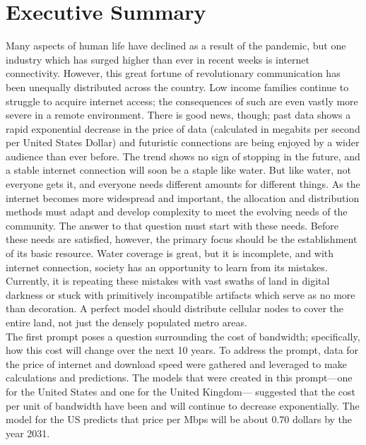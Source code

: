 

\section{Executive Summary}
    \indent Many aspects of human life have declined as a result of the pandemic, but one industry which has surged higher than ever in recent weeks is internet connectivity. However, this great fortune of revolutionary communication has been unequally distributed across the country. Low income families continue to struggle to acquire internet access; the consequences of such are even vastly more severe in a remote environment. There is good news, though; past data shows a rapid exponential decrease in the price of data (calculated in megabits per second per United States Dollar) and futuristic connections are being enjoyed by a wider audience than ever before. The trend shows no sign of stopping in the future, and a stable internet connection will soon be a staple like water. But like water, not everyone gets it, and everyone needs different amounts for different things. As the internet becomes more widespread and important, the allocation and distribution methods must adapt and develop complexity to meet the evolving needs of the community. The answer to that question must start with these needs. Before these needs are satisfied, however, the primary focus should be the establishment of its basic resource. Water coverage is great, but it is incomplete, and with internet connection, society has an opportunity to learn from its mistakes. Currently, it is repeating these mistakes with vast swaths of land in digital darkness or stuck with primitively incompatible artifacts which serve as no more than decoration. A perfect model should distribute cellular nodes to cover the entire land, not just the densely populated metro areas. \\
	\indent The first prompt poses a question surrounding the cost of bandwidth; specifically, how this cost will change over the next 10 years. To address the prompt, data for the price of internet and download speed were gathered and leveraged to make calculations and predictions. The models that were created in this prompt—one for the United States and one for the United Kingdom— suggested that the cost per unit of bandwidth have been and will continue to decrease exponentially. The model for the US predicts that price per Mbps will be about 0.70 dollars by the year 2031. \\
